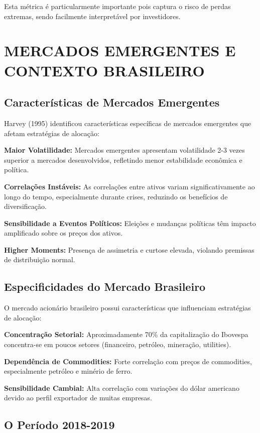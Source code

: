 Esta métrica é particularmente importante pois captura o risco de perdas extremas, sendo facilmente interpretável por investidores.

\section{MERCADOS EMERGENTES E CONTEXTO BRASILEIRO}

\subsection{Características de Mercados Emergentes}

Harvey (1995) identificou características específicas de mercados emergentes que afetam estratégias de alocação:

\textbf{Maior Volatilidade:} Mercados emergentes apresentam volatilidade 2-3 vezes superior a mercados desenvolvidos, refletindo menor estabilidade econômica e política.

\textbf{Correlações Instáveis:} As correlações entre ativos variam significativamente ao longo do tempo, especialmente durante crises, reduzindo os benefícios de diversificação.

\textbf{Sensibilidade a Eventos Políticos:} Eleições e mudanças políticas têm impacto amplificado sobre os preços dos ativos.

\textbf{Higher Moments:} Presença de assimetria e curtose elevada, violando premissas de distribuição normal.

\subsection{Especificidades do Mercado Brasileiro}

O mercado acionário brasileiro possui características que influenciam estratégias de alocação:

\textbf{Concentração Setorial:} Aproximadamente 70\% da capitalização do Ibovespa concentra-se em poucos setores (financeiro, petróleo, mineração, utilities).

\textbf{Dependência de Commodities:} Forte correlação com preços de commodities, especialmente petróleo e minério de ferro.

\textbf{Sensibilidade Cambial:} Alta correlação com variações do dólar americano devido ao perfil exportador de muitas empresas.

\subsection{O Período 2018-2019}

